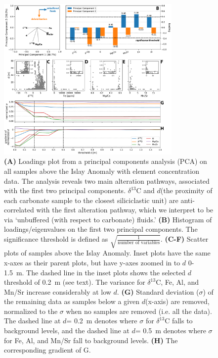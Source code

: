 \documentclass[11pt,letterpaper]{article}
\newcommand{\dC}{$\delta^{13}$C\xspace}
\newcommand{\dsil}{$d$\xspace}
\begin{document}
\begin{figure}[h!]
\begin{center}
	\includegraphics[width=0.8\textwidth]{Figures/Siliciclastic_Filtering.pdf}
	\caption{\textbf{(A)} Loadings plot from a principal components analysis (PCA) on all samples above the Islay Anomaly with element concentration data. The analysis reveals two main alteration pathways, associated with the first two principal components. \dC and \dsil (the proximity of each carbonate sample to the closest siliciclastic unit) are anti-correlated with the first alteration pathway, which we interpret to be via `unbuffered (with respect to carbonate) fluids.' \textbf{(B)} Histogram of loadings/eigenvalues on the first two principal components. The significance threshold is defined as $\sqrt{\frac{1}{\text{number of variables}}}$. \textbf{(C-F)} Scatter plots of samples above the Islay Anomaly. Inset plots have the same x-axes as their parent plots, but have y-axes zoomed in to \dsil 0-1.5~m. The dashed line in the inset plots shows the selected \dsil threshold of 0.2~m (see text). The variance for \dC, Fe, Al, and Mn/Sr increase considerably at low \dsil. \textbf{(G)} Standard deviation ($\sigma$) of the remaining data as samples below a given \dsil (x-axis) are removed, normalized to the $\sigma$ when no samples are removed (i.e. all the data). The dashed line at \dsil = 0.2~m denotes where $\sigma$ for \dC falls to background levels, and the dashed line at \dsil = 0.5~m denotes where $\sigma$ for Fe, Al, and Mn/Sr fall to background levels. \textbf{(H)} The corresponding gradient of G.}
	\label{fig:Siliciclastic_Filtering}
\end{center}
\end{figure}
\end{document}
